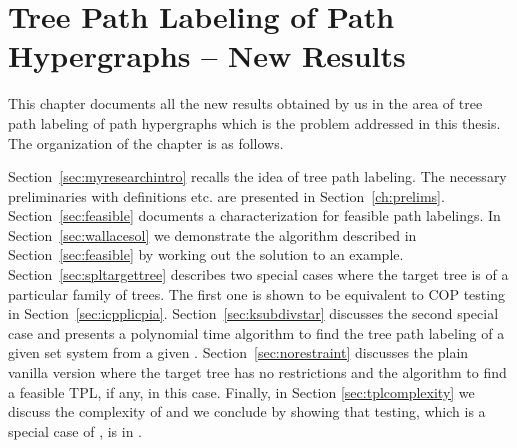 \xclearpage

\chapter[Tree Path Labeling]{Tree Path Labeling of Path
  Hypergraphs -- New Results}
\label{ch:myresearch}

This chapter documents all the new results obtained by us in the area
of tree path labeling of path hypergraphs which is the problem
addressed in this thesis. The organization of the chapter is as
follows.

Section~\ref{sec:myresearchintro} recalls the idea of tree path
labeling. The necessary preliminaries with definitions etc. are
presented in Section~\ref{ch:prelims}. Section~\ref{sec:feasible}
documents a characterization for feasible path labelings. In
Section~\ref{sec:wallacesol} we demonstrate the algorithm described in
Section~\ref{sec:feasible} by working out the solution to an example.
Section~\ref{sec:spltargettree} describes two special cases where the
target tree is of a particular family of trees. The first one is shown
to be equivalent to COP testing in
Section~\ref{sec:icpplicpia}. Section~\ref{sec:ksubdivstar} discusses
the second special case and presents a polynomial time algorithm to
find the tree path labeling of a given set system from a given
\kstar. Section~\ref{sec:norestraint} discusses the plain vanilla
version where the target tree has no restrictions and the algorithm to
find a feasible TPL, if any, in this case.  Finally, in Section
\ref{sec:tplcomplexity} we discuss the complexity of \TPL
and we conclude by showing that \cop testing, which is a
special case of \TPL, is in \logspace.

